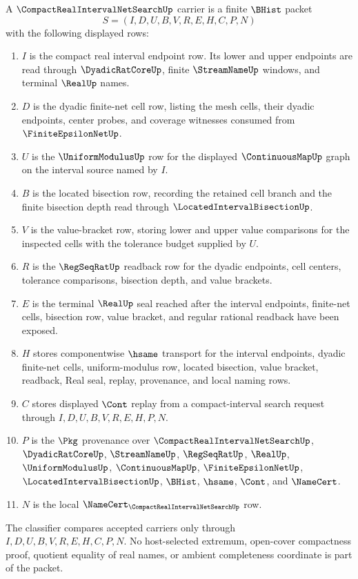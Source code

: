\begin{definition}
\label{def:compact-real-interval-net-search-carrier}
A $\CompactRealIntervalNetSearchUp$ carrier is a finite $\BHist$ packet
$$
S=(I,D,U,B,V,R,E,H,C,P,N)
$$
with the following displayed rows:
\begin{enumerate}
\item $I$ is the compact real interval endpoint row. Its lower and upper endpoints are read through $\DyadicRatCoreUp$, finite $\StreamNameUp$ windows, and terminal $\RealUp$ names.
\item $D$ is the dyadic finite-net cell row, listing the mesh cells, their dyadic endpoints, center probes, and coverage witnesses consumed from $\FiniteEpsilonNetUp$.
\item $U$ is the $\UniformModulusUp$ row for the displayed $\ContinuousMapUp$ graph on the interval source named by $I$.
\item $B$ is the located bisection row, recording the retained cell branch and the finite bisection depth read through $\LocatedIntervalBisectionUp$.
\item $V$ is the value-bracket row, storing lower and upper value comparisons for the inspected cells with the tolerance budget supplied by $U$.
\item $R$ is the $\RegSeqRatUp$ readback row for the dyadic endpoints, cell centers, tolerance comparisons, bisection depth, and value brackets.
\item $E$ is the terminal $\RealUp$ seal reached after the interval endpoints, finite-net cells, bisection row, value bracket, and regular rational readback have been exposed.
\item $H$ stores componentwise $\hsame$ transport for the interval endpoints, dyadic finite-net cells, uniform-modulus row, located bisection, value bracket, readback, Real seal, replay, provenance, and local naming rows.
\item $C$ stores displayed $\Cont$ replay from a compact-interval search request through $I,D,U,B,V,R,E,H,P,N$.
\item $P$ is the $\Pkg$ provenance over $\CompactRealIntervalNetSearchUp$, $\DyadicRatCoreUp$, $\StreamNameUp$, $\RegSeqRatUp$, $\RealUp$, $\UniformModulusUp$, $\ContinuousMapUp$, $\FiniteEpsilonNetUp$, $\LocatedIntervalBisectionUp$, $\BHist$, $\hsame$, $\Cont$, and $\NameCert$.
\item $N$ is the local $\NameCert_{\CompactRealIntervalNetSearchUp}$ row.
\end{enumerate}
The classifier compares accepted carriers only through $I,D,U,B,V,R,E,H,C,P,N$. No host-selected extremum, open-cover compactness proof, quotient equality of real names, or ambient completeness coordinate is part of the packet.
\end{definition}

